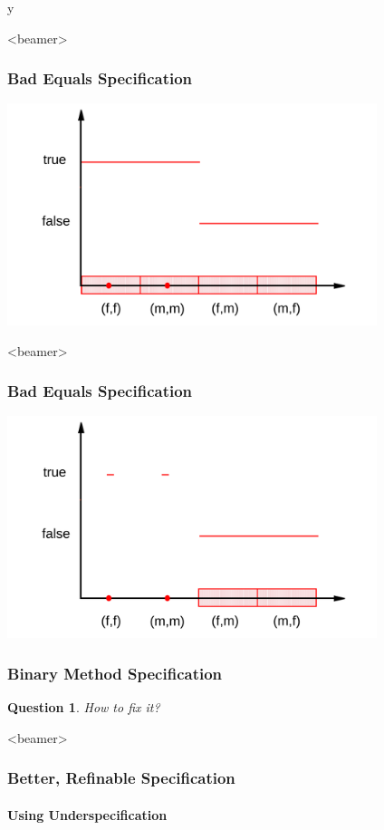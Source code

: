 \if y\MAKEHANDOUTS \documentclass[t,compress,landscape,handout]{beamer}
\newtheorem*{question}{Question}
\begin{document}
\begin{frame}<beamer>
\frametitle{Bad Equals Specification}
\includegraphics[width=4.25in]{equalsbad1}
\end{frame}

\begin{frame}<beamer>
\frametitle{Bad Equals Specification}
\transdissolve[duration=0.5]
\includegraphics[width=4.25in]{equalsbad2}
\end{frame}

\begin{frame}
\frametitle{Binary Method Specification}
\begin{question}
How to fix it?

\rm

\end{question}
\end{frame}

\begin{frame}<beamer>
\frametitle{Better, Refinable Specification}
\framesubtitle{Using Underspecification}

\end{frame}
\end{document}
